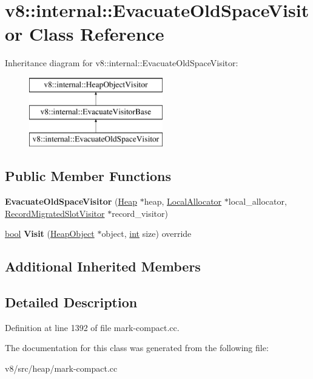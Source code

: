 \hypertarget{classv8_1_1internal_1_1EvacuateOldSpaceVisitor}{}\section{v8\+:\+:internal\+:\+:Evacuate\+Old\+Space\+Visitor Class Reference}
\label{classv8_1_1internal_1_1EvacuateOldSpaceVisitor}
Inheritance diagram for v8\+:\+:internal\+:\+:Evacuate\+Old\+Space\+Visitor\+:\begin{figure}[H]
\begin{center}
\leavevmode
\includegraphics[height=3.000000cm]{classv8_1_1internal_1_1EvacuateOldSpaceVisitor}
\end{center}
\end{figure}
\subsection*{Public Member Functions}
\begin{DoxyCompactItemize}
\item 
\mbox{\label{classv8_1_1internal_1_1EvacuateOldSpaceVisitor_acae1a93209bdeacb31375daaf54323b6}} 
{\bfseries Evacuate\+Old\+Space\+Visitor} (\mbox{\hyperlink{classv8_1_1internal_1_1Heap}{Heap}} $\ast$heap, \mbox{\hyperlink{classv8_1_1internal_1_1LocalAllocator}{Local\+Allocator}} $\ast$local\+\_\+allocator, \mbox{\hyperlink{classv8_1_1internal_1_1RecordMigratedSlotVisitor}{Record\+Migrated\+Slot\+Visitor}} $\ast$record\+\_\+visitor)
\item 
\mbox{\label{classv8_1_1internal_1_1EvacuateOldSpaceVisitor_adf92d5fedcccaa9becddd1e7920f38a0}} 
\mbox{\hyperlink{classbool}{bool}} {\bfseries Visit} (\mbox{\hyperlink{classv8_1_1internal_1_1HeapObject}{Heap\+Object}} $\ast$object, \mbox{\hyperlink{classint}{int}} size) override
\end{DoxyCompactItemize}
\subsection*{Additional Inherited Members}


\subsection{Detailed Description}


Definition at line 1392 of file mark-\/compact.\+cc.



The documentation for this class was generated from the following file\+:\begin{DoxyCompactItemize}
\item 
v8/src/heap/mark-\/compact.\+cc\end{DoxyCompactItemize}
